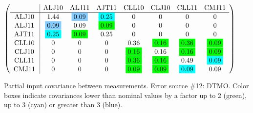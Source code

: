 \begin{table}[H]
\scriptsize
\begin{center}
\renewcommand{\arraystretch}{1.1}
\begin{math}\left(\begin{array}{c|ccccccc}
 & \mathrm{ALJ10} & 
\mathrm{ALJ11} & 
\mathrm{AJT11} & 
\mathrm{CLL10} & 
\mathrm{CLJ10} & 
\mathrm{CLL11} & 
\mathrm{CMJ11} \\
\hline
\mathrm{ALJ10} \hspace*{2pt} &       1.44 &  \colorbox{SkyBlue1}{$      0.09$} &  \colorbox{Cyan1}{$      0.25$} &  0 &  0 &  0 &  0 \\
\mathrm{ALJ11} \hspace*{2pt} &  \colorbox{SkyBlue1}{$      0.09$} &       0.09 &  \colorbox{Green1}{$      0.09$} &  0 &  0 &  0 &  0 \\
\mathrm{AJT11} \hspace*{2pt} &  \colorbox{Cyan1}{$      0.25$} &  \colorbox{Green1}{$      0.09$} &       0.25 &  0 &  0 &  0 &  0 \\
\mathrm{CLL10} \hspace*{2pt} &  0 &  0 &  0 &       0.36 &  \colorbox{Green1}{$      0.16$} &  \colorbox{Green1}{$      0.36$} &  \colorbox{Green1}{$      0.09$} \\
\mathrm{CLJ10} \hspace*{2pt} &  0 &  0 &  0 &  \colorbox{Green1}{$      0.16$} &       0.16 &  \colorbox{Green1}{$      0.16$} &  \colorbox{Green1}{$      0.09$} \\
\mathrm{CLL11} \hspace*{2pt} &  0 &  0 &  0 &  \colorbox{Green1}{$      0.36$} &  \colorbox{Green1}{$      0.16$} &       0.49 &  \colorbox{Cyan1}{$      0.09$} \\
\mathrm{CMJ11} \hspace*{2pt} &  0 &  0 &  0 &  \colorbox{Green1}{$      0.09$} &  \colorbox{Green1}{$      0.09$} &  \colorbox{Cyan1}{$      0.09$} &       0.09 \\
\end{array}\right)\end{math}
\caption{Partial input covariance between measurements. Error source \#12: DTMO. Color boxes indicate covariances lower than nominal values by a factor up to 2 (green), up to 3 (cyan) or greater than 3 (blue).}
\renewcommand{\arraystretch}{1}
\end{center}
\end{table}
